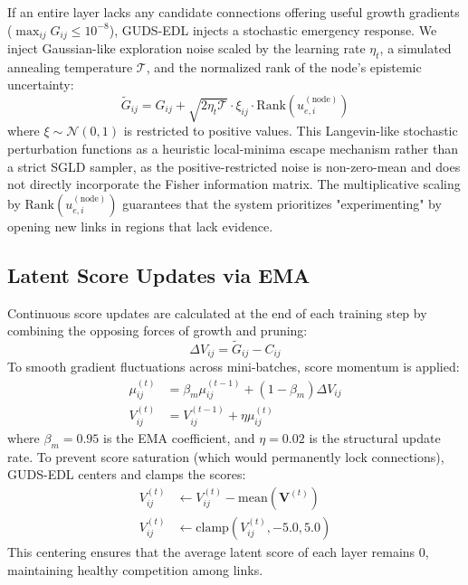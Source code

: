 \documentclass[letterpaper]{article} %
\begin{document}
If an entire layer lacks any candidate connections offering useful growth gradients ($\max_{ij} G_{ij} \le 10^{-8}$), GUDS-EDL injects a stochastic emergency response. We inject Gaussian-like exploration noise scaled by the learning rate $\eta_t$, a simulated annealing temperature $\mathcal{T}$, and the normalized rank of the node's epistemic uncertainty:
\begin{equation}\label{eq:anti_crystal_eq}
    \tilde{G}_{ij} = G_{ij} + \sqrt{2 \eta_t \mathcal{T}} \cdot \xi_{ij} \cdot \text{Rank}(u_{e,i}^{(\text{node})})
\end{equation}
where $\xi \sim \mathcal{N}(0, 1)$ is restricted to positive values. This Langevin-like stochastic perturbation functions as a heuristic local-minima escape mechanism rather than a strict SGLD sampler, as the positive-restricted noise is non-zero-mean and does not directly incorporate the Fisher information matrix. The multiplicative scaling by $\text{Rank}(u_{e,i}^{(\text{node})})$ guarantees that the system prioritizes "experimenting" by opening new links in regions that lack evidence.

\subsection{Latent Score Updates via EMA}\label{subsec:score_update}

Continuous score updates are calculated at the end of each training step by combining the opposing forces of growth and pruning:
\begin{equation}\label{eq:delta_V}
    \Delta V_{ij} = \tilde{G}_{ij} - C_{ij}
\end{equation}
To smooth gradient fluctuations across mini-batches, score momentum is applied:
\begin{align}
    \mu_{ij}^{(t)} &= \beta_m \mu_{ij}^{(t-1)} + (1 - \beta_m) \Delta V_{ij} \\
    V_{ij}^{(t)} &= V_{ij}^{(t-1)} + \eta \mu_{ij}^{(t)}
\end{align}
where $\beta_m = 0.95$ is the EMA coefficient, and $\eta = 0.02$ is the structural update rate. To prevent score saturation (which would permanently lock connections), GUDS-EDL centers and clamps the scores:
\begin{align}
    V_{ij}^{(t)} &\leftarrow V_{ij}^{(t)} - \text{mean}(\bm{V}^{(t)}) \\
    V_{ij}^{(t)} &\leftarrow \text{clamp}(V_{ij}^{(t)}, -5.0, 5.0)
\end{align}
This centering ensures that the average latent score of each layer remains 0, maintaining healthy competition among links.
\end{document}
